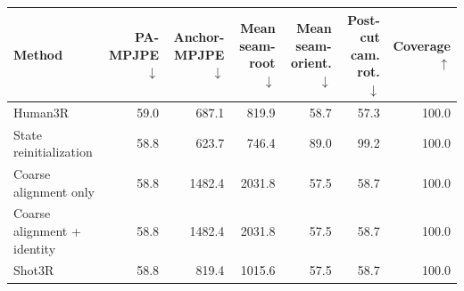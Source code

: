 \begin{tabular}{lrrrrrr}
\toprule
Method & PA-MPJPE $\downarrow$ & Anchor-MPJPE $\downarrow$ & Mean seam-root $\downarrow$ & Mean seam-orient. $\downarrow$ & Post-cut cam. rot. $\downarrow$ & Coverage $\uparrow$ \\
\midrule
Human3R & 59.0 & 687.1 & 819.9 & 58.7 & 57.3 & 100.0 \\
State reinitialization & 58.8 & 623.7 & 746.4 & 89.0 & 99.2 & 100.0 \\
Coarse alignment only & 58.8 & 1482.4 & 2031.8 & 57.5 & 58.7 & 100.0 \\
Coarse alignment + identity & 58.8 & 1482.4 & 2031.8 & 57.5 & 58.7 & 100.0 \\
Shot3R & 58.8 & 819.4 & 1015.6 & 57.5 & 58.7 & 100.0 \\
\bottomrule
\end{tabular}
